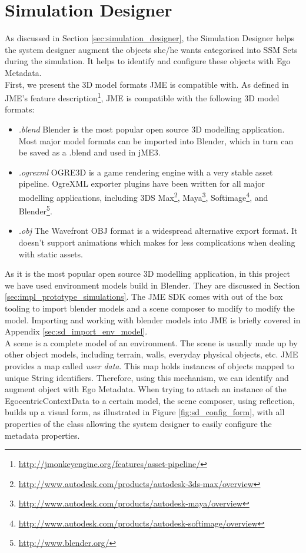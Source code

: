 \section{Simulation Designer} %
\label{sec:impl_simulation_designer}
As discussed in Section \ref{sec:simulation_designer}, the Simulation Designer helps the system designer augment the objects she/he wants categorised into SSM Sets during the simulation. It helps to identify and configure these objects with Ego Metadata.\\

First, we present the 3D model formats JME is compatible with. As defined in JME's feature description\footnote{\url{http://jmonkeyengine.org/features/asset-pipeline/}}, JME is compatible with the following 3D model formats:
\begin{itemize}
	\item \emph{.blend} Blender \cite{blender:online} is the most popular open source 3D modelling application. Most major model formats can be imported into Blender, which in turn can be saved as a .blend and used in jME3.
	\item \emph{.ogrexml} OGRE3D is a game rendering engine with a very stable asset pipeline. OgreXML exporter plugins have been written for all major modelling  applications, including 3DS Max\footnote{\url{http://www.autodesk.com/products/autodesk-3ds-max/overview}}, Maya\footnote{\url{http://www.autodesk.com/products/autodesk-maya/overview}}, Softimage\footnote{\url{http://www.autodesk.com/products/autodesk-softimage/overview}}, and Blender\footnote{\url{http://www.blender.org/}}.
	\item \emph{.obj} The Wavefront OBJ format is a widespread alternative export format. It doesn't support animations which makes for less complications when dealing with static assets.
\end{itemize}

As it is the most popular open source 3D modelling application, in this project we have used environment models build in Blender. They are discussed in Section \ref{sec:impl_prototype_simulations}. The JME SDK comes with out of the box tooling to import blender models and a scene composer to modify to modify the model. Importing and working with blender models into JME is briefly covered in Appendix \ref{sec:sd_import_env_model}.\\

A scene is a complete model of an environment. The scene is usually made up by other object models, including terrain, walls, everyday physical objects, etc. JME provides a map called \emph{user data}. This map holds instances of objects mapped to unique String identifiers. Therefore, using this mechanism, we can identify and augment object with Ego Metadata. When trying to attach an instance of the EgocentricContextData to a certain model, the scene composer, using reflection, builds up a visual form, as illustrated in Figure \ref{fig:sd_config_form}, with all properties of the class allowing the system designer to easily configure the metadata properties.\\

